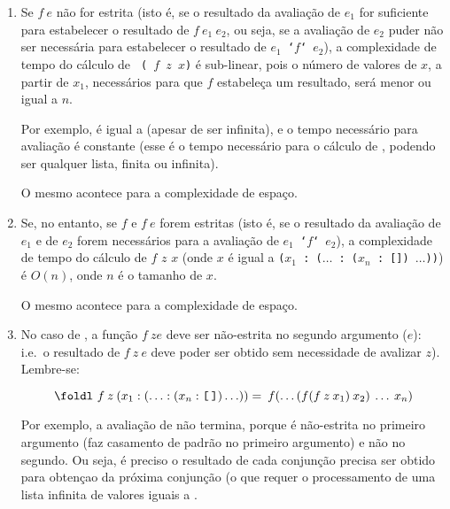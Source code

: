 \begin{enumerate}
    \item Se $f\:e$ não for estrita (isto é, se o resultado da
      avaliação de $e_1$ for suficiente para estabelecer o resultado
      de {\tt $f\:e_1\:e_2$}, ou seja, se a avaliação de $e_2$ puder
      não ser necessária para estabelecer o resultado de {\tt $e_1$
        `$f$` $e_2$}), a complexidade de tempo do cálculo de {\tt
        ( $f$ $z$ $x$)} é sub-linear, pois o número de
      valores de $x$, a partir de $x_1$, necessários para que $f$
      estabeleça um resultado, será menor ou igual a $n$.

      Por exemplo,   é igual a
       (apesar de \ina{[False..]}  ser infinita), e o tempo
      necessário para avaliação é constante (esse é o tempo necessário
      para o cálculo de , podendo  ser qualquer
      lista, finita ou infinita).

      O mesmo acontece para a complexidade de espaço.

    \item Se, no entanto, se $f$ e $f\:e$ forem estritas (isto é, se o
      resultado da avaliação de $e_1$ e de $e_2$ forem necessários
      para a avaliação de {\tt $e_1$ `$f$` $e_2$}), a complexidade de
      tempo do cálculo de  $f$ $z$ $x$ (onde $x$ é igual a
      \texttt{($x_1$ : ($\ldots$ : ($x_n$ : []) $\ldots$))}) é $O(n)$,
      onde $n$ é o tamanho de $x$.

      O mesmo acontece para a complexidade de espaço.

    \item No caso de \foldl, a função $f\:z e$ deve ser não-estrita no
      segundo argumento ($e$): i.e.~o resultado de $f\:z\:e$ deve
      poder ser obtido sem necessidade de avalizar $z$). Lembre-se:

      \[ \foldl\ f\: z\: ( x_1 : (\ldots : (x_n :  \texttt{[\,]}) \ldots)) = 
       \: f ( \ldots (f ( f\: z\: x_1 )\: x_2)\: \ldots\: x_n) \]

      Por exemplo, a avaliação de   não
      termina, porque \ina{(&&)} é não-estrita no primeiro argumento
      (faz casamento de padrão no primeiro argumento) e não no
      segundo. Ou seja, é preciso o resultado de cada conjunção
      precisa ser obtido para obtençao da próxima conjunção (o que
      requer o processamento de uma lista infinita de valores iguais a
      \False.
      
\end{enumerate}

